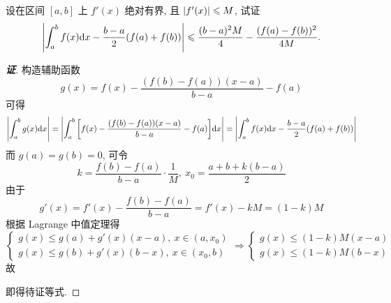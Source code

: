 \begin{example}
    设在区间 $[a,b]$ 上 $f'(x)$ 绝对有界, 且 $\qty|f'(x)|\leqslant M$, 试证
    $$\qty|\int_{a}^{b}f(x)\dd x-\dfrac{b-a}{2}(f(a)+f(b))|\leqslant \dfrac{(b-a)^2M}{4}-\dfrac{(f(a)-f(b))^2}{4M}.$$
\end{example}
\begin{proof}[{\songti \textbf{证}}]
    构造辅助函数 $$g(x)=f(x)-\dfrac{(f(b)-f(a))(x-a)}{b-a}-f(a)$$
    可得 $$\qty|\int_{a}^{b}g(x)\dd x|=\qty|\int_{a}^{b}\qty[f(x)-\dfrac{(f(b)-f(a))(x-a)}{b-a}-f(a)]\dd x|=\qty|\int_{a}^{b}f(x)\dd x-\dfrac{b-a}{2}(f(a)+f(b))|$$
    而 $g(a)=g(b)=0$, 可令 $$k=\dfrac{f(b)-f(a)}{b-a}\cdot\dfrac{1}{M},~x_0=\dfrac{a+b+k(b-a)}{2}$$
    由于 $$g'(x)=f'(x)-\dfrac{f(b)-f(a)}{b-a}=f'(x)-kM=(1-k)M$$
    根据 Lagrange 中值定理得
    $$\begin{cases}
            g(x)\leqslant g(a)+g'(x)(x-a),~x\in(a,x_0) \\
            g(x)\leqslant g(b)+g'(x)(b-x),~x\in(x_0,b)
        \end{cases}\Rightarrow \begin{cases}
            g(x)\leqslant (1-k)M(x-a) \\
            g(x)\leqslant (1-k)M(b-x)
        \end{cases}$$
    故
    即得待证等式.
\end{proof}

